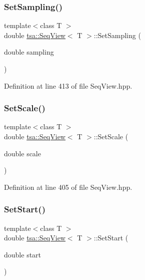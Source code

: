\subsubsection{\texorpdfstring{Set\+Sampling()}{SetSampling()}}
{\footnotesize\ttfamily template$<$class T $>$ \\
double \hyperlink{classtsa_1_1_seq_view}{tsa\+::\+Seq\+View}$<$ T $>$\+::Set\+Sampling (\begin{DoxyParamCaption}\item[{double}]{sampling }\end{DoxyParamCaption})\hspace{0.3cm}{\ttfamily [inline]}}



Definition at line 413 of file Seq\+View.\+hpp.

\mbox{\label{classtsa_1_1_seq_view_ab231d10dc992831a0b34abecb7d08934}} 
\subsubsection{\texorpdfstring{Set\+Scale()}{SetScale()}}
{\footnotesize\ttfamily template$<$class T $>$ \\
double \hyperlink{classtsa_1_1_seq_view}{tsa\+::\+Seq\+View}$<$ T $>$\+::Set\+Scale (\begin{DoxyParamCaption}\item[{double}]{scale }\end{DoxyParamCaption})\hspace{0.3cm}{\ttfamily [inline]}}



Definition at line 405 of file Seq\+View.\+hpp.

\mbox{\label{classtsa_1_1_seq_view_a9c1615ded80ed552128b574c78ba182d}} 
\subsubsection{\texorpdfstring{Set\+Start()}{SetStart()}}
{\footnotesize\ttfamily template$<$class T $>$ \\
double \hyperlink{classtsa_1_1_seq_view}{tsa\+::\+Seq\+View}$<$ T $>$\+::Set\+Start (\begin{DoxyParamCaption}\item[{double}]{start }\end{DoxyParamCaption})\hspace{0.3cm}{\ttfamily [inline]}}



